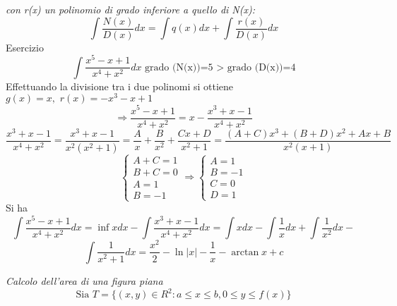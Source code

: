 \begin{description}
		\textit{con r(x) un polinomio di grado inferiore a quello di N(x):}
		\begin{equation*}
			\int \frac{N(x)}{D(x)}dx=\int q(x)dx+\int \frac{r(x)}{D(x)}dx
		\end{equation*}
		Esercizio
		\begin{equation*}
			\int \frac{x^5-x+1}{x^4+x^2}dx \text{ grado (N(x))=5 > grado
			(D(x))=4}
		\end{equation*}
		Effettuando la divisione tra i due polinomi si ottiene $g(x)=x, \text{
		} r(x)=-x^3-x+1$
		\begin{equation*}
			\Rightarrow \frac{x^5-x+1}{x^4+x^2}=x-\frac{x^3+x-1}{x^4+x^2}
		\end{equation*}
		\begin{equation*}
			\frac{x^3+x-1}{x^4+x^2}=\frac{x^3+x-1}{x^2(x^2+1)}=\frac{A}{x}+
			\frac{B}{x^2}+\frac{Cx+D}{x^2+1}=
			\frac{(A+C)x^3+(B+D)x^2+Ax+B}{x^2(x+1)}
		\end{equation*}
		\begin{equation*}
			\begin{cases}
				A+C=1\\
				B+C=0\\
				A=1\\
				B=-1
			\end{cases}\Rightarrow
			\begin{cases}
				A=1\\
				B=-1\\
				C=0\\
				D=1
			\end{cases}
		\end{equation*}
		Si ha
		\begin{equation*}
			\int \frac{x^5-x+1}{x^4+x^2}dx=\inf xdx-\int
			\frac{x^3+x-1}{x^4+x^2}dx=\int xdx-\int \frac{1}{x}dx+\int
			\frac{1}{x^2} dx-
		\end{equation*}
		\begin{equation*}
			\int\frac{1}{x^2+1}dx=\frac{x^2}{2}-\ln|x|-\frac{1}{x}-\arctan x+c
		\end{equation*}
\end{description}
\textit{\color{red}Calcolo dell'area di una figura piana}
\begin{equation*}
	\text{Sia } T=\{(x,y)\in R^2:a\leq x\leq b, 0\leq y\leq f(x)\}
\end{equation*}
